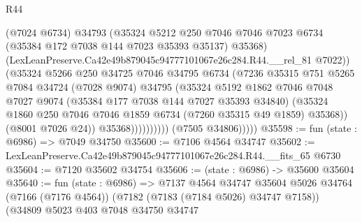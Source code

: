 \begin{lexlean}{R44}
\begin{coremodule}
{                                (@7024 @6734)
                                @34793
                                (@35324
                                  @5212
                                  @250
                                  @7046
                                  @7046
                                  @7023
                                  @6734
                                  (@35384 @172 @7038 @144 @7023 @35393 @35137)
                                  @35368)
                                (LexLeanPreserve.Ca42e49b879045c94777101067e26c284.R44.__rel_81
                                  @7022))
                              (@35324
                                @5266
                                @250
                                @34725
                                @7046
                                @34795
                                @6734
                                (@7236
                                  @35315
                                  @751
                                  @5265
                                  @7084
                                  @34724
                                  (@7028 @9074)
                                  @34795
                                  (@35324
                                    @5192
                                    @1862
                                    @7046
                                    @7048
                                    @7027
                                    @9074
                                    (@35384 @177 @7038 @144 @7027 @35393 @34840)
                                    (@35324
                                      @1860
                                      @250
                                      @7046
                                      @7046
                                      @1859
                                      @6734
                                      (@7260 @35315 @49 @1859)
                                      @35368))
                                  (@8001 @7026 @24))
                                @35368))))))))))
            (@7505 @34806)))))
@35598 := fun (state : @6986) => @7049 @34750
@35600 := @7106 @4564 @34747
@35602 := LexLeanPreserve.Ca42e49b879045c94777101067e26c284.R44.__fits_65 @6730
@35604 := @7120 @35602 @34754
@35606 := (state : @6986) -> @35600 @35604
@35640 := fun (state : @6986) =>
  @7137
    @4564
    @34747
    @35604
    @5026
    @34764
    (@7166 (@7176 @4564))
    (@7182 (@7183 (@7184 @5026) @34747 @7158))
    (@34809
      @5023
      @403
      @7048
      @34750
      @34747
}
\end{coremodule}
\end{lexlean}
